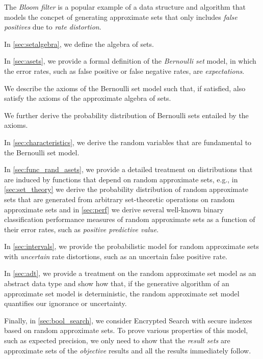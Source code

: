 \documentclass[10pt,final,hidelinks]{article}
\numberwithin{equation}{section}
\theoremstyle{plain}
\begin{document}
The \emph{Bloom filter} is a popular example of a data structure and algorithm that models the concpet of generating approximate sets that only includes \emph{false positives} due to \emph{rate distortion}.

In \cref{sec:setalgebra}, we define the algebra of sets.

In \cref{sec:asets}, we provide a formal definition of the \emph{Bernoulli set} model, in which the error rates, such as false positive or false negative rates, are \emph{expectations}.

We describe the axioms of the Bernoulli set model such that, if satisfied, also satisfy the axioms of the approximate algebra of sets.

We further derive the probability distribution of Bernoulli sets entailed by the axioms.

In \cref{sec:characteristics}, we derive the random variables that are fundamental to the Bernoulli set model.

In \cref{sec:func_rand_asets}, we provide a detailed treatment on distributions that are induced by functions that depend on random approximate sets, e.g., in \cref{sec:set_theory} we derive the probability distribution of random approximate sets that are generated from arbitrary set-theoretic operations on random approximate sets and in \cref{sec:perf} we derive several well-known binary classification performance measures of random approximate sets as a function of their error rates, such as \emph{positive predictive value}.

In \cref{sec:intervals}, we provide the probabilistic model for random approximate sets with \emph{uncertain} rate distortions, such as an uncertain false positive rate.

In \cref{sec:adt}, we provide a treatment on the random approximate set model as an abstract data type and show how that, if the generative algorithm of an approximate set model is deterministic, the random approximate set model quantifies our ignorance or uncertainty.

Finally, in \cref{sec:bool_search}, we consider Encrypted Search with secure indexes based on random approximate sets.
To prove various properties of this model, such as expected precision, we only need to show that the \emph{result sets} are approximate sets of the \emph{objective} results and all the results immediately follow.
\end{document}
